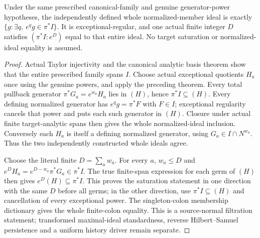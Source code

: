 \begin{theorem}
\label{hir:actual-relative-normalized-member-total-saturation}
\leanok
Under the same prescribed canonical-family and genuine generator-power
hypotheses, the independently defined whole normalized-member ideal is
exactly $\{g:\exists q,\ e^qg\in\pi^*I\}$. It is exceptional-regular,
and one actual finite integer $D$ satisfies $(\pi^*I:e^D)$ equal to that
entire ideal. No target saturation or normalized-ideal equality is assumed.
\end{theorem}
\begin{proof}
Actual Taylor injectivity and the canonical analytic basis theorem show that
the entire prescribed family spans $I$. Choose actual exceptional quotients
$H_a$ once using the genuine powers, and apply the preceding theorem.
Every total pullback generator $\pi^*G_a=e^{w_a}H_a$ lies in $(H)$, hence
$\pi^*I\subseteq(H)$. Every defining normalized generator has $e^qg=\pi^*F$ with $F\in I$;
exceptional regularity cancels that power and puts each such generator in
$(H)$. Closure under actual finite target-analytic spans then gives the
whole normalized-ideal inclusion. Conversely each $H_a$ is itself a defining
normalized generator, using $G_a\in I\cap N^{w_a}$. Thus the two independently
constructed whole ideals agree.

Choose the literal finite $D=\sum_aw_a$. For every $a$, $w_a\le D$ and
$e^DH_a=e^{D-w_a}\pi^*G_a\in\pi^*I$. The true finite-span expression for
each germ of $(H)$ then gives $e^D(H)\subseteq\pi^*I$. This proves the
saturation statement in one direction with the same $D$ before all germs;
in the other direction, use $\pi^*I\subseteq(H)$ and cancellation of every
exceptional power. The singleton-colon membership dictionary gives the
whole finite-colon equality. This is a source-normal filtration statement;
transformed maximal-ideal standardness, reverse Hilbert--Samuel persistence
and a uniform history driver remain separate.
\end{proof}


